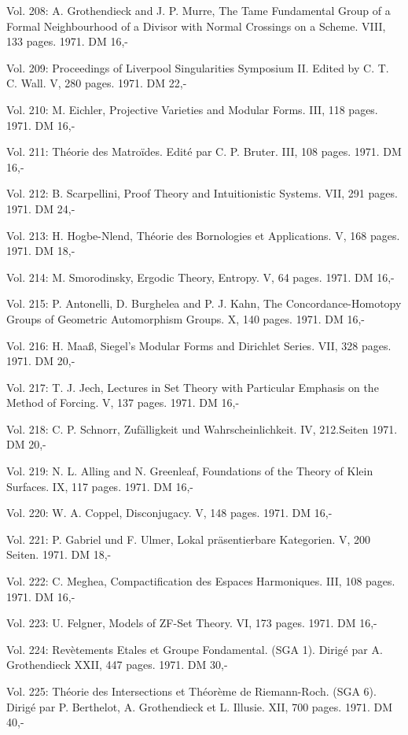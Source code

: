Vol. 208: A. Grothendieck and J. P. Murre, The Tame Fundamental Group of a Formal Neighbourhood of a Divisor with Normal Crossings on a Scheme. VIII, 133 pages. 1971. DM 16,-

Vol. 209: Proceedings of Liverpool Singularities \quad Symposium II. Edited by C. T. C. Wall. V, 280 pages. 1971. DM 22,-

Vol. 210: M. Eichler, Projective Varieties and Modular Forms. III, 118 pages. 1971. DM 16,-

Vol. 211: Théorie des Matroïdes. Edité par C. P. Bruter. III, 108 pages. 1971. DM 16,-

Vol. 212: B. Scarpellini, Proof Theory and Intuitionistic Systems. VII, 291 pages. 1971. DM 24,-

Vol. 213: H. Hogbe-Nlend, Théorie des Bornologies et Applications. V, 168 pages. 1971. DM 18,-

Vol. 214: M. Smorodinsky, Ergodic Theory, Entropy. V, 64 pages. 1971. DM 16,-

Vol. 215: P. Antonelli, D. Burghelea and P. J. Kahn, The Concordance-Homotopy Groups of Geometric Automorphism Groups. X, 140 pages. 1971. DM 16,-

Vol. 216: H. Maaß, Siegel's Modular Forms and Dirichlet Series. VII, 328 pages. 1971. DM 20,-

Vol. 217: T. J. Jech, Lectures in Set Theory with Particular Emphasis on the Method of Forcing. V, 137 pages. 1971. DM 16,-

Vol. 218: C. P. Schnorr, Zufälligkeit und Wahrscheinlichkeit. IV, 212.Seiten 1971. DM 20,-

Vol. 219: N. L. Alling and N. Greenleaf, Foundations of the Theory of Klein Surfaces. IX, 117 pages. 1971. DM 16,-

Vol. 220: W. A. Coppel, Disconjugacy. V, 148 pages. 1971. DM 16,-

Vol. 221: P. Gabriel und F. Ulmer, Lokal präsentierbare Kategorien. V, 200 Seiten. 1971. DM 18,-

Vol. 222: C. Meghea, Compactification des Espaces Harmoniques. III, 108 pages. 1971. DM 16,-

Vol. 223: U. Felgner, Models of ZF-Set Theory. VI, 173 pages. 1971. DM 16,-

Vol. 224: Revètements Etales et Groupe Fondamental. (SGA 1). Dirigé par A. Grothendieck XXII, 447 pages. 1971. DM 30,-

Vol. 225: Théorie des Intersections et Théorème de Riemann-Roch. (SGA 6). Dirigé par P. Berthelot, A. Grothendieck et L. Illusie. XII, 700 pages. 1971. DM 40,-

